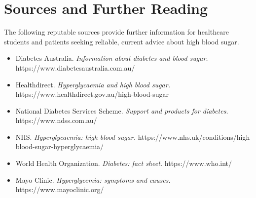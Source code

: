 \section*{Sources and Further Reading}
The following reputable sources provide further information for healthcare students and patients seeking reliable, current advice about high blood sugar.

\begin{itemize}
    \item Diabetes Australia. \textit{Information about diabetes and blood sugar.} https://www.diabetesaustralia.com.au/
    \item Healthdirect. \textit{Hyperglycaemia and high blood sugar.} https://www.healthdirect.gov.au/high-blood-sugar
    \item National Diabetes Services Scheme. \textit{Support and products for diabetes.} https://www.ndss.com.au/
    \item NHS. \textit{Hyperglycaemia: high blood sugar.} https://www.nhs.uk/conditions/high-blood-sugar-hyperglycaemia/
    \item World Health Organization. \textit{Diabetes: fact sheet.} https://www.who.int/
    \item Mayo Clinic. \textit{Hyperglycemia: symptoms and causes.} https://www.mayoclinic.org/
\end{itemize}
